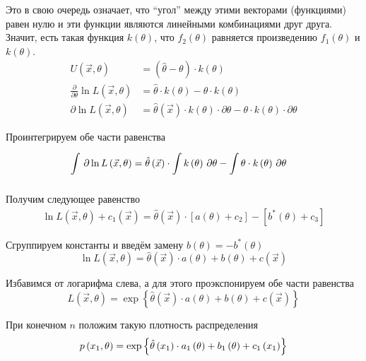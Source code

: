 Это в свою очередь означает,
что ``угол'' между этими векторами (функциями) равен нулю
и эти функции являются линейными комбинациями друг друга.
Значит, есть такая функция $k\left( \theta \right)$, что
$f_2\left( \theta \right)$ равняется произведению
$f_1\left( \theta \right)$ и $k\left( \theta \right)$.
\begin{align*}
    U\left( \vec{x},\theta \right)
        &=\left( \hat{\theta}-\theta \right)\cdot k\left( \theta \right)\\
    \frac{\partial}{\partial\theta}\ln{L\left( \vec{x},\theta \right)}
        &=\hat{\theta}\cdot k\left( \theta \right)
            -\theta\cdot k\left( \theta \right)\\
    \partial\ln{L\left( \vec{x},\theta \right)}
        &=\hat{\theta}\left( \vec{x} \right)
                \cdot k\left( \theta \right)\cdot\partial\theta
            -\theta\cdot k\left( \theta \right)\cdot\partial\theta
\end{align*}

Проинтегрируем обе части равенства
\begin{align*}
    \int\limits_{}^{}  \, \partial \ln{L\left( \vec{x},\theta \right)}
        &=\hat{\theta}\left( \vec{x} \right)
                \cdot \int\limits_{}^{} k\left( \theta \right) \, \partial \theta
            -\int\limits_{}^{} \theta\cdot k\left( \theta \right) \, \partial \theta
\end{align*}

Получим следующее равенство
\begin{align*}
    \ln{L\left( \vec{x},\theta \right)}+c_1\left( \vec{x} \right)
        =\hat{\theta}\left( \vec{x} \right)
                \cdot \left[ a\left( \theta \right)+c_2\right]
            -\left[b^*\left( \theta \right)+c_3\right]
\end{align*}

Сгруппируем константы и введём замену
$b\left( \theta \right)=-b^*\left( \theta \right)$
$$\ln{L\left( \vec{x},\theta \right)}
    =\hat{\theta}\left( \vec{x} \right)\cdot a\left( \theta \right)
        +b\left( \theta \right)+c\left( \vec{x} \right)$$

Избавимся от логарифма слева, а для этого проэкспонируем обе части равенства
$$L\left( \vec{x},\theta \right)
    =\exp{\left\{\hat{\theta}\left( \vec{x} \right)\cdot a\left( \theta \right)
    +b\left( \theta \right)+c\left( \vec{x} \right)\right\}}$$

При конечном $n$ положим такую плотность распределения
$$p\left(x_1,\theta\right)
    =\exp{\left\{\hat{\theta}\left(x_1\right)\cdot a_1\left(\theta\right)
        +b_1\left( \theta \right)+c_1\left( x_1 \right)\right\}}$$

